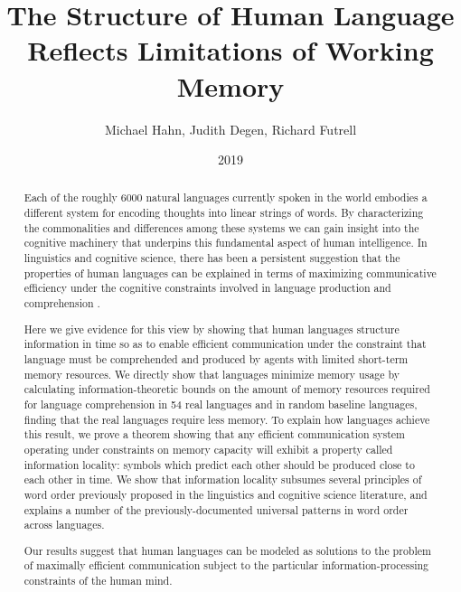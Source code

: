 \documentclass[12pt]{article}
\title{The Structure of Human Language Reflects Limitations of Working Memory}
\author{Michael Hahn, Judith Degen, Richard Futrell}
\date{2019}
\date{}
\newcounter{theorem}
\begin{document}
\baselineskip24pt


\maketitle

\begin{abstract}
  Each of the roughly 6000 natural languages currently spoken in the world embodies a different system for encoding thoughts into linear strings of words.
  By characterizing the commonalities and differences among these systems we can gain insight into the cognitive machinery that underpins this fundamental aspect of human intelligence. 
  In linguistics and cognitive science, there has been a persistent suggestion that the properties of human languages can be explained in terms of maximizing communicative efficiency under the cognitive constraints involved in language production and comprehension \cite{gibson2019efficiency,florian,hawkins,piantadosi2011word,zipf1949}.

  Here we give evidence for this view by showing that human languages structure information in time so as to enable efficient communication under the constraint that language must be comprehended and produced by agents with limited short-term memory resources.
  We directly show that languages minimize memory usage by calculating information-theoretic bounds on the amount of memory resources required for language comprehension in 54 real languages and in random baseline languages, finding that the real languages require less memory.
  To explain how languages achieve this result, we prove a theorem showing that any efficient communication system operating under constraints on memory capacity will exhibit a property called information locality: symbols which predict each other should be produced close to each other in time.
  We show that information locality subsumes several principles of word order previously proposed in the linguistics and cognitive science literature, and explains a number of the previously-documented universal patterns in word order across languages.
  
  Our results suggest that human languages can be modeled as solutions to the problem of maximally efficient communication subject to the particular information-processing constraints of the human mind. 
\end{abstract}
\end{document}
